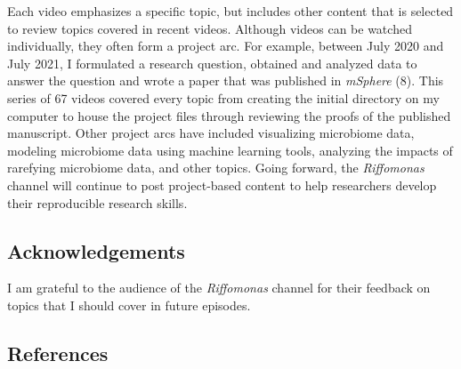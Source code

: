 \documentclass[
]{article}
\begin{document}
Each video emphasizes a specific topic, but includes other content that
is selected to review topics covered in recent videos. Although videos
can be watched individually, they often form a project arc. For example,
between July 2020 and July 2021, I formulated a research question,
obtained and analyzed data to answer the question and wrote a paper that
was published in \emph{mSphere} (8). This series of 67 videos covered
every topic from creating the initial directory on my computer to house
the project files through reviewing the proofs of the published
manuscript. Other project arcs have included visualizing microbiome
data, modeling microbiome data using machine learning tools, analyzing
the impacts of rarefying microbiome data, and other topics. Going
forward, the \emph{Riffomonas} channel will continue to post
project-based content to help researchers develop their reproducible
research skills.

\hypertarget{acknowledgements}{%
\subsection{Acknowledgements}\label{acknowledgements}}

I am grateful to the audience of the \emph{Riffomonas} channel for their
feedback on topics that I should cover in future episodes.

\newpage

\hypertarget{references}{%
\subsection{References}\label{references}}
\end{document}
